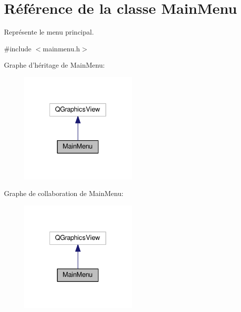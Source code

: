\hypertarget{classMainMenu}{\section{Référence de la classe Main\+Menu}
\label{classMainMenu}
}


Représente le menu principal.  




{\ttfamily \#include $<$mainmenu.\+h$>$}



Graphe d'héritage de Main\+Menu\+:\nopagebreak
\begin{figure}[H]
\begin{center}
\leavevmode
\includegraphics[width=164pt]{db/d55/classMainMenu__inherit__graph}
\end{center}
\end{figure}


Graphe de collaboration de Main\+Menu\+:\nopagebreak
\begin{figure}[H]
\begin{center}
\leavevmode
\includegraphics[width=164pt]{d8/d60/classMainMenu__coll__graph}
\end{center}
\end{figure}
